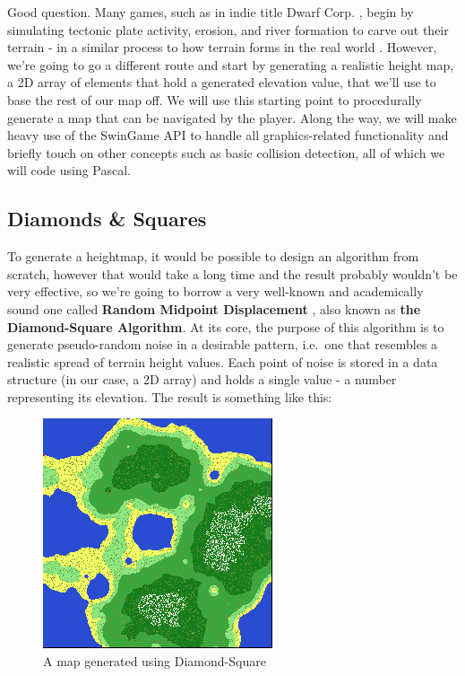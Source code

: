 \documentclass{article}
\begin{document}
Good question. Many games, such as in indie title Dwarf Corp. \parencite{dwarfcorp}, begin by simulating tectonic plate activity, erosion, and river formation to carve out their terrain -  in a similar process to how terrain forms in the real world \parencite[pp. 46]{huggett}. However, we're going to go a different route and start by generating a realistic height map, a 2D array of elements that hold a generated elevation value, that we'll use to base the rest of our map off. We will use this starting point to procedurally generate a map that can be navigated by the player. Along the way, we will make heavy use of the SwinGame API to handle all graphics-related functionality and briefly touch on other concepts such as basic collision detection, all of which we will code using Pascal.
	
	
\subsection{Diamonds \& Squares}


To generate a heightmap, it would be possible to design an algorithm from scratch, however that would take a long time and the result probably wouldn't be very effective, so we're going to borrow a very well-known and academically sound one called \textbf{Random Midpoint Displacement} \parencite{fournier}, also known as \textbf{the Diamond-Square Algorithm}. At its core, the purpose of this algorithm is to generate pseudo-random noise in a desirable pattern, i.e.~one that resembles a realistic spread of terrain height values. Each point of noise is stored in a data structure (in our case, a 2D array) and holds a single value - a number representing its elevation. The result is something like this:
	
\begin{figure}[H]
	\centering
	\includegraphics{map.jpg}
	\renewcommand{\figurename}{Example}
	\caption{A map generated using Diamond-Square}
\end{figure}
\end{document}
